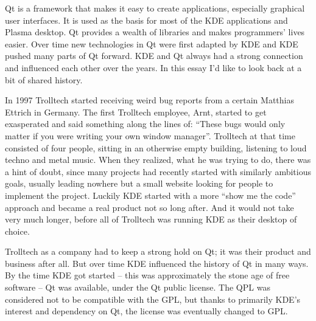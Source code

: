 

\noindent{}Qt is a framework that makes it easy to create applications, especially graphical user interfaces. It is used as the basis for most of the KDE applications and Plasma desktop. Qt provides a wealth of libraries and makes programmers' lives easier. Over time new technologies in Qt were first adapted by KDE and KDE pushed many parts of Qt forward. KDE and Qt always had a strong connection and influenced each other over the years. In this essay I'd like to look back at a bit of shared history.

In 1997 Trolltech started receiving weird bug reports from a certain Matthias Ettrich in Germany. The first Trolltech employee, Arnt, started to get exasperated and said something along the lines of: “These bugs would only matter if you were writing your own window manager”. Trolltech at that time consisted of four people, sitting in an otherwise empty building, listening to loud techno and metal music. When they realized, what he was trying to do, there was a hint of doubt, since many projects had recently started with similarly ambitious goals, usually leading nowhere but a small website looking for people to implement the project. Luckily KDE started with a more “show me the code” approach and became a real product not so long after. And it would not take very much longer, before all of Trolltech was running KDE as their desktop of choice.

Trolltech as a company had to keep a strong hold on Qt; it was their product and business after all. But over time KDE influenced the history of Qt in many ways. By the time KDE got started – this was approximately the stone age of free software – Qt was available, under the Qt public license. The QPL was considered not to be compatible with the GPL, but thanks to primarily KDE’s interest and dependency on Qt, the license was eventually changed to GPL.

